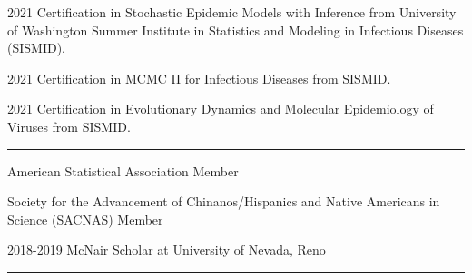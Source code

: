 \documentclass{article}
\begin{document}


\begin{description}
	\vspace{-2mm}
	\item[Certifications]\hspace*{.01in}
	
		2021 Certification in Stochastic Epidemic Models with Inference from University of Washington Summer Institute in Statistics and Modeling in Infectious Diseases (SISMID).
		\vspace*{1mm}
		
		2021 Certification in MCMC II for Infectious Diseases from SISMID.
		\vspace*{1mm}
		
		2021 Certification in Evolutionary Dynamics and Molecular Epidemiology of Viruses from SISMID.
	
\end{description}
\vspace{-2mm}
\rule{\linewidth}{1pt}




\begin{description}
	\vspace{-2mm}
	\item[Programs and Professional Membership]\hspace*{.01in}
		
		American Statistical Association Member
		\vspace*{1mm}
		
		Society for the Advancement of Chinanos/Hispanics and Native Americans in Science (SACNAS) Member
		\vspace*{1mm}
		
		2018-2019 McNair Scholar at University of Nevada, Reno
		
\end{description}
\vspace{-2mm}
\rule{\linewidth}{1pt}



\end{document}
